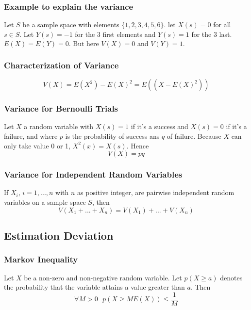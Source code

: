 \documentclass{article}
\begin{document}
\subsubsection{Example to explain the variance} Let $ S $ be a sample space with elements $ \{1,2,3,4,5,6\} $. let $ X(s) = 0 $ for all $ s \in S $. Let $ Y(s) = -1 $ for the 3 first elements and $ Y(s) = 1 $ for the 3 last. $ E(X) = E(Y) = 0 $. But here $ V(X) =  0 $ and $ V(Y) = 1 $.

\subsubsection{Characterization of Variance}
\begin{equation}
V(X) = E(X^2) - E(X)^2 = E((X - E(X)^2))
\end{equation}

\subsubsection{Variance for Bernoulli Trials} Let $ X $ a random variable with $ X(s) = 1 $ if it's a success and $ X(s) = 0 $ if it's a failure, and where $ p $ is the probability of success ans $ q $ of failure. Because $ X $ can only take value 0 or 1, $ X^2(x) = X(s) $. Hence
\begin{equation}
V(X) = pq
\end{equation}

\subsubsection{Variance for Independent Random Variables} If $ X_i $, $ i = 1,...,n $ with $ n $ as positive integer, are pairwise independent random variables on a sample space $ S $, then
\begin{equation}
V(X_1 + ... + X_n) = V(X_1) + ... + V(X_n)
\end{equation}

\subsection{Estimation Deviation}
\subsubsection{Markov Inequality} Let $ X $ be a non-zero and non-negative random variable. Let $ p(X \geq a) $ denotes the probability that the variable attains a value greater than $ a $. Then
\begin{equation}
\forall M > 0 \textit{  } p(X \geq ME(X)) \leq \frac{1}{M}
\end{equation}
\end{document}
